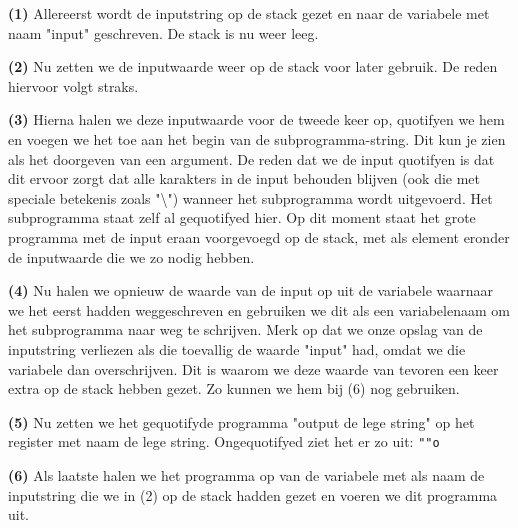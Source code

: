 \begin{description}
\item \textbf{(1)} Allereerst wordt de inputstring op de stack gezet en naar de
variabele met naam "input" geschreven. De stack is nu weer leeg.
\item \textbf{(2)}
Nu zetten we de inputwaarde weer op de stack voor later gebruik. De reden
hiervoor volgt straks.
\item \textbf{(3)} Hierna halen we deze inputwaarde voor de
tweede keer op, quotifyen we hem en voegen we het toe aan het begin van de
subprogramma-string. Dit kun je zien als het doorgeven van een argument. De
reden dat we de input quotifyen is dat dit ervoor zorgt dat alle karakters in
de input behouden blijven (ook die met speciale betekenis zoals
"\textbackslash{}") wanneer het subprogramma wordt uitgevoerd. Het subprogramma
staat zelf al gequotifyed hier.  Op dit moment staat het grote programma met de
input eraan voorgevoegd op de stack, met als element eronder de inputwaarde die
we zo nodig hebben.
\item \textbf{(4)} Nu halen we opnieuw de waarde van de input op
uit de variabele waarnaar we het eerst hadden weggeschreven en gebruiken we dit
als een variabelenaam om het subprogramma naar weg te schrijven. Merk op dat we
onze opslag van de inputstring verliezen als die toevallig de waarde "input"
had, omdat we die variabele dan overschrijven. Dit is waarom we deze waarde van
tevoren een keer extra op de stack hebben gezet. Zo kunnen we hem bij (6) nog
gebruiken.
\item \textbf{(5)} Nu zetten we het gequotifyde programma "output de lege
string" op het register met naam de lege string. Ongequotifyed ziet het er zo
uit: \texttt{""o}
\item \textbf{(6)} Als laatste halen we het programma op van de
variabele met als naam de inputstring die we in (2) op de stack hadden gezet en
voeren we dit programma uit.
\end{description}